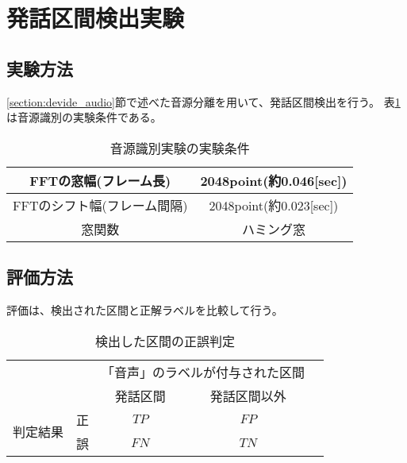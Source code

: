 \section{発話区間検出実験}
\subsection{実験方法}
\ref{section:devide_audio}節で述べた音源分離を用いて、発話区間検出を行う。
表\ref{table:detail_identification_method}は音源識別の実験条件である。

\begin{table}[H]
  \begin{center}
    \caption{音源識別実験の実験条件 \label{table:detail_identification_method}}
    \begin{tabular}{|c||c|} \hline
      FFTの窓幅(フレーム長) & 2048point(約0.046[sec])   \\ \hline
      FFTのシフト幅(フレーム間隔) &  2048point(約0.023[sec]) \\ \hline
      窓関数 & ハミング窓  \\ \hline
    \end{tabular}
  \end{center}
\end{table}

\subsection{評価方法}
評価は、検出された区間と正解ラベルを比較して行う。

\begin{table}[H]
\begin{center}
    \caption{検出した区間の正誤判定 \label{table:search_table}}
\begin{tabular}{|c|c|c|c|l}
\cline{1-4}
\multicolumn{2}{|c|}{\multirow{2}{*}{}} & \multicolumn{2}{c|}{「音声」のラベルが付与された区間} &  \\ \cline{3-4}
\multicolumn{2}{|c|}{}                  & 発話区間        & 発話区間以外        &  \\ \cline{1-4}
\multirow{2}{*}{判定結果}        & 正        & $TP$                  & $FP$                   &  \\ \cline{2-4}
& 誤        & $FN$                  & $TN$                   &  \\ \cline{1-4}
\end{tabular}
\end{center}
\end{table}

